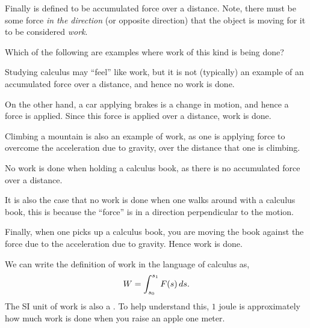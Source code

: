 \documentclass{ximera}
\begin{document}
Finally  is defined to be accumulated force over a
distance. Note, there must be some force \textit{in the direction} (or
opposite direction) that the object is moving for it to be considered
\textit{work}.
\begin{question}
  Which of the following are examples where work of this kind is being done?
  \begin{selectAll}
  \end{selectAll}
  \begin{feedback}
    Studying calculus may ``feel'' like work, but it is not
    (typically) an example of an accumulated force over a distance,
    and hence no work is done.

    On the other hand, a car applying brakes is a change in motion, and
    hence a force is applied. Since this force is applied over a
    distance, work is done.

    Climbing a mountain is also an example of work, as one is applying
    force to overcome the acceleration due to gravity, over the
    distance that one is climbing.

    No work is done when holding a calculus book, as there is no
    accumulated force over a distance.

    It is also the case that no work is done when one walks around
    with a calculus book, this is because the ``force'' is in a
    direction perpendicular to the motion.

    Finally, when one picks up a calculus book, you are moving the
    book against the force due to the acceleration due to
    gravity. Hence work is done.
  \end{feedback}
\end{question}
We can write the definition of work in the language of calculus as,
\[
W = \int_{s_0}^{s_1} F(s) \,d s.
\]
The SI unit of work is also a . To help understand this,
$1$ joule is approximately how much work is done when you raise an
apple one meter.
\end{document}
